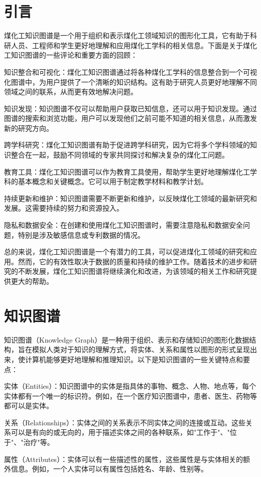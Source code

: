\section{引言}
煤化工知识图谱是一个用于组织和表示煤化工领域知识的图形化工具，它有助于科研人员、工程师和学生更好地理解和应用煤化工学科的相关信息。下面是关于煤化工知识图谱的一些评论和重要方面的回顾：

知识整合和可视化：煤化工知识图谱通过将各种煤化工学科的信息整合到一个可视化图谱中，为用户提供了一个清晰的知识结构。这有助于研究人员更好地理解不同领域之间的联系，从而更有效地解决问题。

知识发现：知识图谱不仅可以帮助用户获取已知信息，还可以用于知识发现。通过图谱的搜索和浏览功能，用户可以发现他们之前可能不知道的相关信息，从而激发新的研究方向。

跨学科研究：煤化工知识图谱有助于促进跨学科研究，因为它将多个学科领域的知识整合在一起，鼓励不同领域的专家共同探讨和解决复杂的煤化工问题。

教育工具：煤化工知识图谱可以作为教育工具使用，帮助学生更好地理解煤化工学科的基本概念和关键概念。它可以用于制定教学材料和教学计划。

持续更新和维护：知识图谱需要不断更新和维护，以反映煤化工领域的最新研究和发展。这需要持续的努力和资源投入。

隐私和数据安全：在创建和使用煤化工知识图谱时，需要注意隐私和数据安全问题，特别是涉及敏感信息或专利数据的情况。

总的来说，煤化工知识图谱是一个有潜力的工具，可以促进煤化工领域的研究和应用。然而，它的有效性取决于数据的质量和持续的维护工作。随着技术的进步和研究的不断发展，煤化工知识图谱将继续演化和改进，为该领域的相关工作和研究提供更大的帮助。

\section{知识图谱}
知识图谱（Knowledge Graph）是一种用于组织、表示和存储知识的图形化数据结构，旨在模拟人类对于知识的理解方式，将实体、关系和属性以图形的形式呈现出来，使计算机能够更好地理解和推理知识。以下是知识图谱的一些关键特点和要点：

实体（Entities）：知识图谱中的实体是指具体的事物、概念、人物、地点等，每个实体都有一个唯一的标识符。例如，在一个医疗知识图谱中，患者、医生、药物等都可以是实体。

关系（Relationships）：实体之间的关系表示不同实体之间的连接或互动。这些关系可以是有向的或无向的，用于描述实体之间的各种联系，如"工作于"、"位于"、"治疗"等。

属性（Attributes）：实体可以有一些描述性的属性，这些属性是与实体相关的额外信息。例如，一个人实体可以有属性包括姓名、年龄、性别等。

